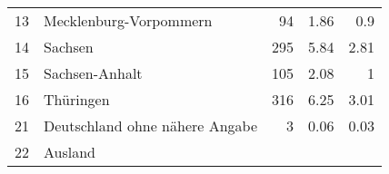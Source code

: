 \begin{longtable}{lXrrr}
     13 &
     \multicolumn{1}{X}{ Mecklenburg-Vorpommern   } &


       \num{94} &
       \num[round-mode=places,round-precision=2]{1,86} &
         \num[round-mode=places,round-precision=2]{0,9} \\

     14 &
     \multicolumn{1}{X}{ Sachsen   } &


       \num{295} &
       \num[round-mode=places,round-precision=2]{5,84} &
         \num[round-mode=places,round-precision=2]{2,81} \\

     15 &
     \multicolumn{1}{X}{ Sachsen-Anhalt   } &


       \num{105} &
       \num[round-mode=places,round-precision=2]{2,08} &
         \num[round-mode=places,round-precision=2]{1} \\

     16 &
     \multicolumn{1}{X}{ Thüringen   } &


       \num{316} &
       \num[round-mode=places,round-precision=2]{6,25} &
         \num[round-mode=places,round-precision=2]{3,01} \\

     21 &
     \multicolumn{1}{X}{ Deutschland ohne nähere Angabe   } &


       \num{3} &
       \num[round-mode=places,round-precision=2]{0,06} &
         \num[round-mode=places,round-precision=2]{0,03} \\

     22 &
     \multicolumn{1}{X}{ Ausland   } &



\end{longtable}
